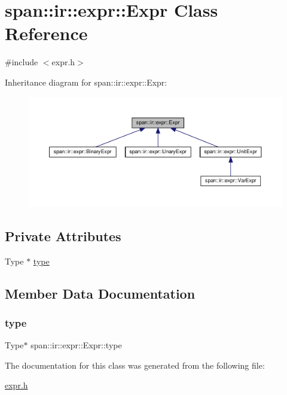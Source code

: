 \hypertarget{classspan_1_1ir_1_1expr_1_1Expr}{}\section{span\+:\+:ir\+:\+:expr\+:\+:Expr Class Reference}
\label{classspan_1_1ir_1_1expr_1_1Expr}


{\ttfamily \#include $<$expr.\+h$>$}



Inheritance diagram for span\+:\+:ir\+:\+:expr\+:\+:Expr\+:\nopagebreak
\begin{figure}[H]
\begin{center}
\leavevmode
\includegraphics[width=350pt]{classspan_1_1ir_1_1expr_1_1Expr__inherit__graph}
\end{center}
\end{figure}
\subsection*{Private Attributes}
\begin{DoxyCompactItemize}
\item 
Type $\ast$ \hyperlink{classspan_1_1ir_1_1expr_1_1Expr_a065b6906c11566167a91521b1a4edfbe}{type}
\end{DoxyCompactItemize}


\subsection{Member Data Documentation}
\mbox{\label{classspan_1_1ir_1_1expr_1_1Expr_a065b6906c11566167a91521b1a4edfbe}} 
\subsubsection{\texorpdfstring{type}{type}}
{\footnotesize\ttfamily Type$\ast$ span\+::ir\+::expr\+::\+Expr\+::type\hspace{0.3cm}{\ttfamily [private]}}



The documentation for this class was generated from the following file\+:\begin{DoxyCompactItemize}
\item 
\hyperlink{expr_8h}{expr.\+h}\end{DoxyCompactItemize}
